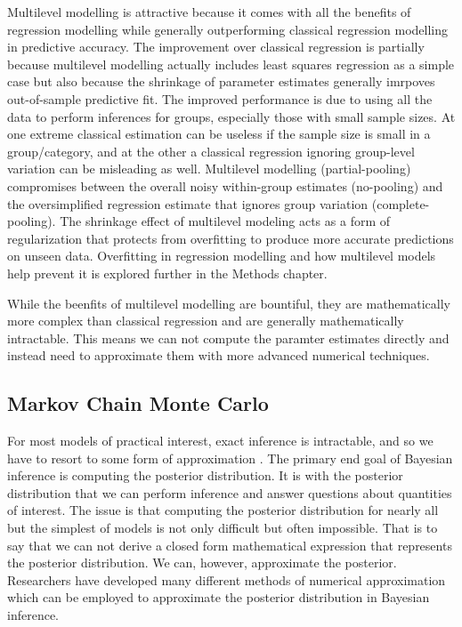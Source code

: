Multilevel modelling is attractive because it comes with all the benefits of regression modelling while generally outperforming classical regression modelling in predictive accuracy. The improvement over classical regression is partially because multilevel modelling actually includes least squares regression as a simple case but also because the shrinkage of parameter estimates generally imrpoves out-of-sample predictive fit. The improved performance is due to using all the data to perform inferences for groups, especially those with small sample sizes. At one extreme classical estimation can be useless if the sample size is small in a group/category, and at the other a classical regression ignoring group-level variation can be misleading as well. Multilevel modelling (partial-pooling) compromises between the overall noisy within-group estimates (no-pooling) and the oversimplified regression estimate that ignores group variation (complete-pooling). The shrinkage effect of multilevel modeling acts as a form of regularization that protects from overfitting to produce more accurate predictions on unseen data. Overfitting in regression modelling and how multilevel models help prevent it is explored further in the Methods chapter.

While the beenfits of multilevel modelling are bountiful, they are mathematically more complex than classical regression and are generally mathematically intractable. This means we can not compute the paramter estimates directly and instead need to approximate them with more advanced numerical techniques.

\subsection{Markov Chain Monte Carlo}

For most models of practical interest, exact inference is intractable, and so we have to resort to some form of approximation \cite{Bishop2006}. The primary end goal of Bayesian inference is computing the posterior distribution. It is with the posterior distribution that we can perform inference and answer questions about quantities of interest. The issue is that computing the posterior distribution for nearly all but the simplest of models is not only difficult but often impossible. That is to say that we can not derive a closed form mathematical expression that represents the posterior distribution. We can, however, approximate the posterior. Researchers have developed many different methods of numerical approximation which can be employed to approximate the posterior distribution in Bayesian inference.

